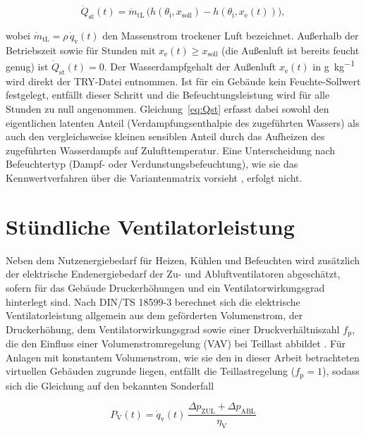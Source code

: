 \documentclass{scrreprt}
\begin{document}
\begin{equation}\label{eq:Qst}
    \dot Q_{\mathrm{st}}(t) = \dot m_{\mathrm{tL}} \, \bigl(h(\theta_{\mathrm{i}}, x_{\mathrm{soll}}) - h(\theta_{\mathrm{i}}, x_{\mathrm{e}}(t))\bigr),
\end{equation}

wobei $\dot m_{\mathrm{tL}} = \rho \, \dot q_{\mathrm{v}}(t)$ den
Massenstrom trockener Luft bezeichnet. Außerhalb der Betriebszeit
sowie für Stunden mit $x_{\mathrm{e}}(t) \geq x_{\mathrm{soll}}$ (die
Außenluft ist bereits feucht genug) ist $\dot Q_{\mathrm{st}}(t) = 0$.
Der Wasserdampfgehalt der Außenluft $x_{\mathrm{e}}(t)$ in \si{\gram\per\kilo\gram} wird direkt der
\ac{TRY}-Datei entnommen. Ist für ein Gebäude kein Feuchte-Sollwert
festgelegt, entfällt dieser Schritt und die Befeuchtungsleistung wird
für alle Stunden zu null angenommen. Gleichung~\eqref{eq:Qst} erfasst
dabei sowohl den eigentlichen latenten Anteil (Verdampfungsenthalpie
des zugeführten Wassers) als auch den vergleichsweise kleinen
sensiblen Anteil durch das Aufheizen des zugeführten Wasserdampfs auf
Zulufttemperatur. Eine Unterscheidung nach Befeuchtertyp (Dampf- oder
Verdunstungsbefeuchtung), wie sie das Kennwertverfahren über die
Variantenmatrix vorsieht \parencite{DIN185993}, erfolgt nicht.



\section{Stündliche Ventilatorleistung}
Neben dem Nutzenergiebedarf für Heizen, Kühlen und Befeuchten wird
zusätzlich der elektrische Endenergiebedarf der Zu- und
Abluftventilatoren abgeschätzt, sofern für das Gebäude Druckerhöhungen
und ein Ventilatorwirkungsgrad hinterlegt sind. Nach DIN/TS 18599-3
berechnet sich die elektrische Ventilatorleistung allgemein aus dem
geförderten Volumenstrom, der Druckerhöhung, dem Ventilatorwirkungsgrad
sowie einer Druckverhältniszahl $f_{\mathrm{p}}$, die den Einfluss
einer Volumenstromregelung (\ac{VAV}) bei Teillast abbildet
\parencite{DIN185993}. Für Anlagen mit konstantem Volumenstrom, wie sie
den in dieser Arbeit betrachteten virtuellen Gebäuden zugrunde liegen,
entfällt die Teillastregelung ($f_{\mathrm{p}}=1$), sodass sich die
Gleichung auf den bekannten Sonderfall

\begin{equation}\label{eq:PV}
    P_{\mathrm{V}}(t) = \dot q_{\mathrm{v}}(t) \, \frac{\Delta p_{\mathrm{ZUL}} + \Delta p_{\mathrm{ABL}}}{\eta_{\mathrm{V}}}
\end{equation}
\end{document}
